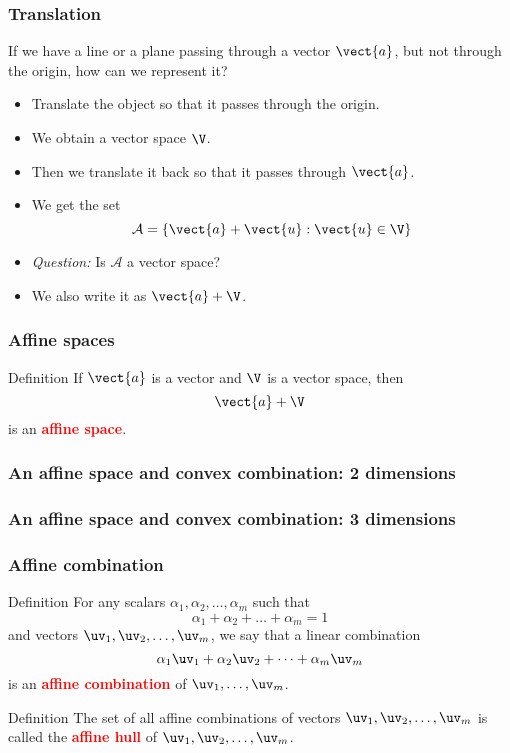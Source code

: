 \begin{frame}
  \frametitle{Translation}

  If we have a line or a plane passing through a vector $\vect{a}$,
  but not through the origin, how can we represent it?

  \pause

  \begin{itemize}
  \item Translate the object so that it passes through the origin.
    \pause
  \item We obtain a vector space $\V$.
    \pause
  \item Then we translate it back so that it passes through $\vect{a}$.
    \pause
  \item We get the set
    \[
    {\mathcal A} = \{ \vect{a} + \vect{u} : \vect{u} \in \V \}
    \]
    \pause
  \item {\em Question:} Is $\mathcal A$ a vector space?
    \pause
  \item We also write it as $\vect{a} + \V$.
  \end{itemize}
\end{frame}

\begin{frame}
  \frametitle{Affine spaces}

  \begin{block}{Definition}
    If $\vect{a}$ is a vector and $\V$ is a vector space, then
    \[
    \vect{a} + \V
    \]
    is an \textcolor{red}{\bf affine space}.
  \end{block}
\end{frame}

\begin{frame}
  \frametitle{An affine space and convex combination: 2 dimensions}
\end{frame}

\begin{frame}
  \frametitle{An affine space and convex combination: 3 dimensions}
\end{frame}

\begin{frame}
  \frametitle{Affine combination}
  
  \begin{block}{Definition}
    For any scalars $\alpha_1,\alpha_2,\ldots,\alpha_m$
    such that 
    \[
    \alpha_1 + \alpha_2 + \ldots + \alpha_m = 1
    \]
    and vectors $\uv_1,\uv_2,\ldots,\uv_m$, we say that a linear combination
    \[
    \alpha_1\uv_1 + \alpha_2\uv_2 + \cdots + \alpha_m \uv_m
    \]
    is an \textcolor{red}{\bf affine combination} of $\uv_1,\ldots,\uv_m$.
  \end{block}

  \pause

  \begin{block}{Definition}
    The set of all affine combinations of 
    vectors $\uv_1,\uv_2,\ldots,\uv_m$
    is called the \textcolor{red}{\bf affine hull} of
    $\uv_1,\uv_2,\ldots,\uv_m$.
  \end{block}

\end{frame}

